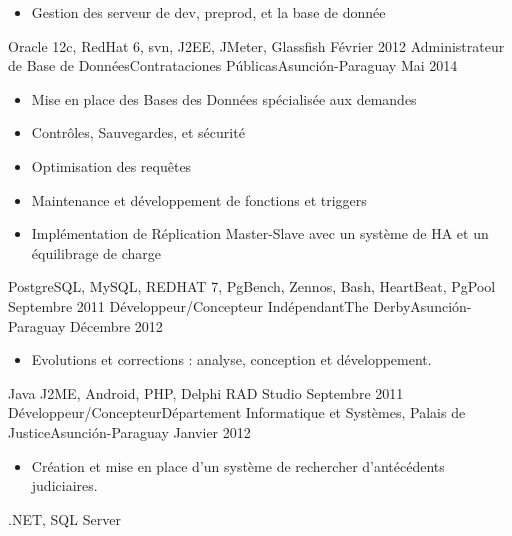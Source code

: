 \begin{experiences}
{\begin{itemize}
                        \item Gestion des serveur de dev, preprod, et la base de donnée
                      \end{itemize}
				         }
                 {Oracle 12c, RedHat 6, svn, J2EE, JMeter, Glassfish}
  \emptySeparator
  \experience
    {Février 2012}   {Administrateur de Base de Données}{Contrataciones Públicas}{Asunción-Paraguay}
    {Mai 2014} {
                      \begin{itemize}
                        \item Mise en place des Bases des Données spécialisée aux demandes
                        \item Contrôles, Sauvegardes, et sécurité
                        \item Optimisation des requêtes
                        \item Maintenance et développement de fonctions et triggers
                        \item Implémentation de Réplication Master-Slave avec un système de HA et un équilibrage de charge
                      \end{itemize}
				}
                {PostgreSQL, MySQL, REDHAT 7, PgBench, Zennos, Bash, HeartBeat, PgPool}
  \emptySeparator
  \experience
    {Septembre 2011}   {Développeur/Concepteur Indépendant}{The Derby}{Asunción-Paraguay}
    {Décembre 2012} {
                      \begin{itemize}
                        \item Evolutions et corrections : analyse, conception et développement.
                      \end{itemize}
				}
                {Java J2ME, Android, PHP, Delphi RAD Studio}
  \emptySeparator
  \experience
    {Septembre 2011}   {Développeur/Concepteur}{Département Informatique et Systèmes, Palais de Justice}{Asunción-Paraguay}
    {Janvier 2012} {
                      \begin{itemize}
                        \item Création et mise en place d’un système de rechercher d’antécédents judiciaires.
                      \end{itemize}
				}
                {.NET, SQL Server}
  \emptySeparator
\end{experiences}
